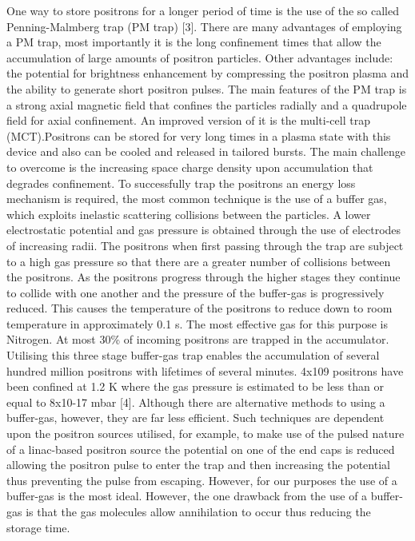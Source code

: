 One way to store positrons for a longer period of time is the use of the so called Penning-Malmberg trap (PM trap) [3]. There are many advantages of employing a PM trap, most importantly it is the long confinement times that allow the accumulation of large amounts of positron particles. Other advantages include: the potential for brightness enhancement by compressing the positron plasma and the ability to generate short positron pulses.
The main features of the PM trap is a strong axial magnetic field that confines the particles radially and a quadrupole field for axial confinement. An improved version of it is the multi-cell trap (MCT).Positrons can be stored for very long times in a plasma state with this device and also can be cooled and released in tailored bursts. The main challenge to overcome is the increasing space charge density upon accumulation that degrades confinement. 
To successfully trap the positrons an energy loss mechanism is required, the most common technique is the use of a buffer gas, which exploits inelastic scattering collisions between the particles. A lower electrostatic potential and gas pressure is obtained through the use of electrodes of increasing radii. The positrons when first passing through the trap are subject to a high gas pressure so that there are a greater number of collisions between the positrons. As the positrons progress through the higher stages they continue to collide with one another and the pressure of the buffer-gas is progressively reduced. This causes the temperature of the positrons to reduce down to room temperature in approximately 0.1 s. The most effective gas for this purpose is Nitrogen. At most 30\% of incoming positrons are trapped in the accumulator. Utilising this three stage buffer-gas trap enables the accumulation of several hundred million positrons with lifetimes of several minutes. 4x109 positrons have been confined at 1.2 K where the gas pressure is estimated to be less than or equal to 8x10-17 mbar [4].
Although there are alternative methods to using a buffer-gas, however, they are far less efficient. Such techniques are dependent upon the positron sources utilised, for example, to make use of the pulsed nature of a linac-based positron source the potential on one of the end caps is reduced allowing the positron pulse to enter the trap and then increasing the potential thus preventing the pulse from escaping. However, for our purposes the use of a buffer-gas is the most ideal. However, the one drawback from the use of a buffer-gas is that the gas molecules allow annihilation to occur thus reducing the storage time.
